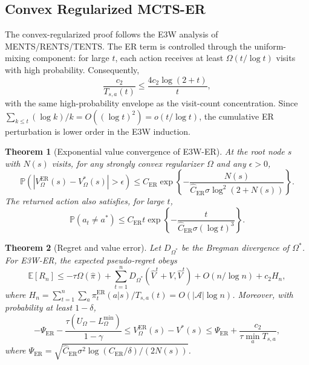 \documentclass{article}
\newtheorem{theorem}{Theorem}
\newcommand{\E}{\mathbb{E}}
\newcommand{\Prob}{\mathbb{P}}
\begin{document}
\subsection{Convex Regularized MCTS-ER}
\label{sec:main_convex_results}
The convex-regularized proof follows the E3W analysis of MENTS/RENTS/TENTS.  The ER term is controlled through the uniform-mixing component: for large $t$, each action receives at least $\Omega(t/\log t)$ visits with high probability.  Consequently,
\begin{equation}
\frac{c_2}{T_{s,a}(t)}\leq \frac{4c_2\log(2+t)}{t},
\label{eq:main_er_perturb}
\end{equation}
with the same high-probability envelope as the visit-count concentration.  Since $\sum_{k\leq t}(\log k)/k=O((\log t)^2)=o(t/\log t)$, the cumulative ER perturbation is lower order in the E3W induction.

\begin{theorem}[Exponential value convergence of E3W-ER]
\label{thm:main_exp_value_statement}
At the root node $s$ with $N(s)$ visits, for any strongly convex regularizer $\Omega$ and any $\epsilon>0$,
\[
\Prob\left(|V_\Omega^{\mathrm{ER}}(s)-V_\Omega^*(s)|>\epsilon\right)
\leq C_{\mathrm{ER}}\exp\left\{-\frac{N(s)}{\hat C_{\mathrm{ER}}\sigma\log^2(2+N(s))}\right\}.
\]
The returned action also satisfies, for large $t$,
\[
\Prob(a_t\neq a^*)\leq C_{\mathrm{ER}}t\exp\left\{-\frac{t}{\hat C_{\mathrm{ER}}\sigma(\log t)^3}\right\}.
\]
\end{theorem}

\begin{theorem}[Regret and value error]
\label{thm:main_regret_error_statement}
Let $D_{\Omega^*}$ be the Bregman divergence of $\Omega^*$.  For E3W-ER, the expected pseudo-regret obeys
\[
\E[R_n]\leq -\tau\Omega(\hat\pi)+\sum_{t=1}^nD_{\Omega^*}(\hat V^t+V,\hat V^t)+O(n/\log n)+c_2H_n,
\]
where $H_n=\sum_{t=1}^n\sum_a\pi_t^{\mathrm{ER}}(a|s)/T_{s,a}(t)=O(|\mathcal A|\log n)$.  Moreover, with probability at least $1-\delta$,
\[
-\Psi_{\mathrm{ER}}-\frac{\tau(U_\Omega-L_\Omega^{\min})}{1-\gamma}
\leq V_\Omega^{\mathrm{ER}}(s)-V^*(s)
\leq \Psi_{\mathrm{ER}}+\frac{c_2}{\tau\min_aT_{s,a}},
\]
where $\Psi_{\mathrm{ER}}=\sqrt{\hat C_{\mathrm{ER}}\sigma^2\log(C_{\mathrm{ER}}/\delta)/(2N(s))}$.
\end{theorem}
\end{document}
